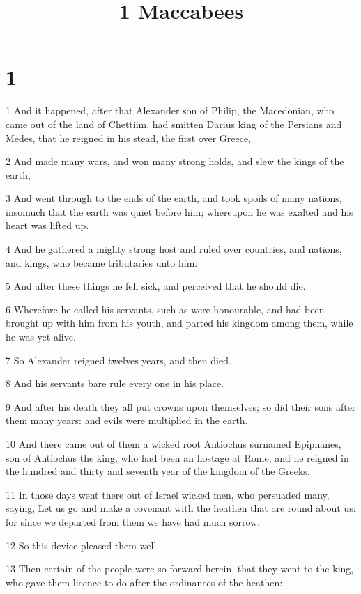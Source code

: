

\title{1 Maccabees}

\chapter{1}

\par 1 And it happened, after that Alexander son of Philip, the Macedonian, who came out of the land of Chettiim, had smitten Darius king of the Persians and Medes, that he reigned in his stead, the first over Greece,
\par 2 And made many wars, and won many strong holds, and slew the kings of the earth,
\par 3 And went through to the ends of the earth, and took spoils of many nations, insomuch that the earth was quiet before him; whereupon he was exalted and his heart was lifted up.
\par 4 And he gathered a mighty strong host and ruled over countries, and nations, and kings, who became tributaries unto him.
\par 5 And after these things he fell sick, and perceived that he should die.
\par 6 Wherefore he called his servants, such as were honourable, and had been brought up with him from his youth, and parted his kingdom among them, while he was yet alive.
\par 7 So Alexander reigned twelves years, and then died.
\par 8 And his servants bare rule every one in his place.
\par 9 And after his death they all put crowns upon themselves; so did their sons after them many years: and evils were multiplied in the earth.
\par 10 And there came out of them a wicked root Antiochus surnamed Epiphanes, son of Antiochus the king, who had been an hostage at Rome, and he reigned in the hundred and thirty and seventh year of the kingdom of the Greeks.
\par 11 In those days went there out of Israel wicked men, who persuaded many, saying, Let us go and make a covenant with the heathen that are round about us: for since we departed from them we have had much sorrow.
\par 12 So this device pleased them well.
\par 13 Then certain of the people were so forward herein, that they went to the king, who gave them licence to do after the ordinances of the heathen:

